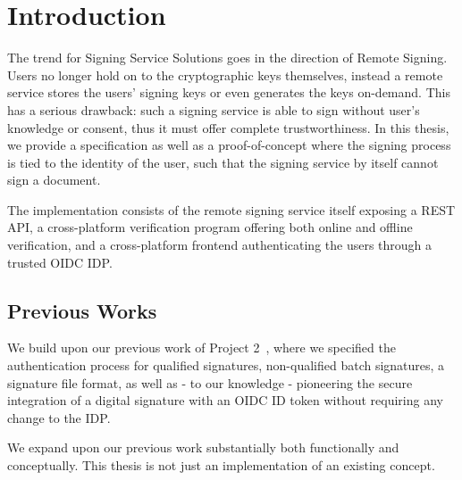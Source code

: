\chapter{Introduction}
\label{ch:Introduction}

The trend for Signing Service Solutions goes in the direction of Remote Signing.
Users no longer hold on to the cryptographic keys themselves,
instead a remote service stores the users' signing keys or even generates the keys on-demand.
This has a serious drawback:
such a signing service is able to sign without user's knowledge or consent,
thus it must offer complete trustworthiness.
In this thesis,
we provide a specification as well as a proof-of-concept where the signing process is tied to the identity of the user,
such that the signing service by itself cannot sign a document.

The implementation consists of the remote signing service itself exposing a \gls{REST} \gls{API},
a cross-platform verification program offering both online and offline verification,
and a cross-platform frontend authenticating the users through a trusted \gls{OIDC} \gls{IDP}.


\section{Previous Works}
\label{section:previousworks}

We build upon our previous work of Project 2~\cite{projekt2},
where we specified the authentication process for qualified signatures,
non-qualified batch signatures,
a signature file format,
as well as - to our knowledge - pioneering the secure integration of a digital signature with an \gls{OIDC} ID token without requiring any change to the \gls{IDP}.

We expand upon our previous work substantially both functionally and conceptually.
This thesis is not just an implementation of an existing concept.

